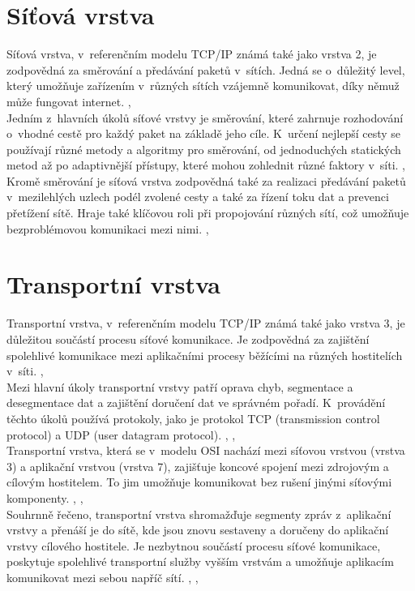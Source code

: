 \documentclass[12pt]{report}			%
\begin{document}
			\section{Síťová vrstva}
Síťová vrstva, v~referenčním modelu TCP/IP známá také jako vrstva 2, je zodpovědná za směrování a předávání paketů v~sítích. Jedná se o~důležitý level, který umožňuje zařízením v~různých sítích vzájemně komunikovat, díky němuž může fungovat internet. \cite{sit1}, \cite{sit2}
\\
Jedním z~hlavních úkolů síťové vrstvy je směrování, které zahrnuje rozhodování o~vhodné cestě pro každý paket na základě jeho cíle. K~určení nejlepší cesty se používají různé metody a algoritmy pro směrování, od jednoduchých statických metod až po adaptivnější přístupy, které mohou zohlednit různé faktory v~síti. \cite{sit1}, \cite{sit2}
\\
Kromě směrování je síťová vrstva zodpovědná také za realizaci předávání paketů v~mezilehlých uzlech podél zvolené cesty a také za řízení toku dat a prevenci přetížení sítě. Hraje také klíčovou roli při propojování různých sítí, což umožňuje bezproblémovou komunikaci mezi nimi. \cite{sit1}, \cite{sit2}


			\section{Transportní vrstva}
Transportní vrstva, v~referenčním modelu TCP/IP známá také jako vrstva 3, je důležitou součástí procesu síťové komunikace. Je zodpovědná za zajištění spolehlivé komunikace mezi aplikačními procesy běžícími na různých hostitelích v~síti. \cite{tran1}, \cite{tran2}
\\
Mezi hlavní úkoly transportní vrstvy patří oprava chyb, segmentace a desegmentace dat a zajištění doručení dat ve správném pořadí. K~provádění těchto úkolů používá protokoly, jako je protokol TCP (transmission control protocol) a UDP (user datagram protocol). \cite{tran1}, \cite{tran2}, \cite{tran3}
\\
Transportní vrstva, která se v~modelu OSI nachází mezi síťovou vrstvou (vrstva 3) a aplikační vrstvou (vrstva 7), zajišťuje koncové spojení mezi zdrojovým a cílovým hostitelem. To jim umožňuje komunikovat bez rušení jinými síťovými komponenty. \cite{tran1}, \cite{tran2},  \cite{tran3}
\\
Souhrnně řečeno, transportní vrstva shromažďuje segmenty zpráv z~aplikační vrstvy a přenáší je do sítě, kde jsou znovu sestaveny a doručeny do aplikační vrstvy cílového hostitele. Je nezbytnou součástí procesu síťové komunikace, poskytuje spolehlivé transportní služby vyšším vrstvám a umožňuje aplikacím komunikovat mezi sebou napříč sítí. \cite{tran1}, \cite{tran2}, \cite{tran3}
\end{document}
